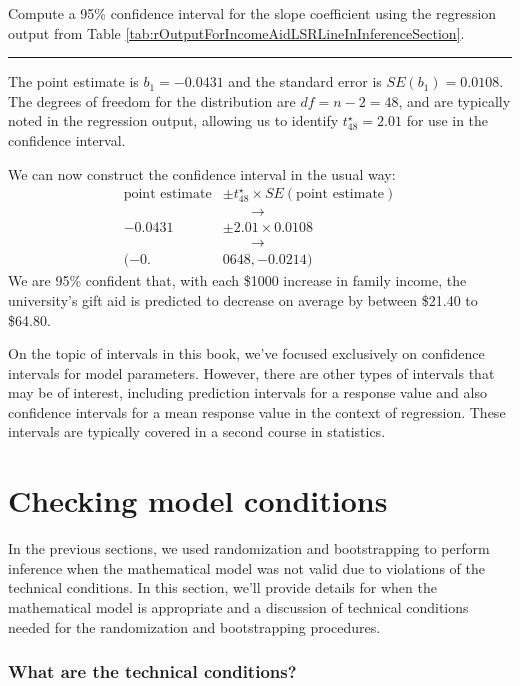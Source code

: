 \documentclass[
  10pt,
  openany]{book}
\theoremstyle{definition}
\theoremstyle{definition}
\theoremstyle{definition}
\theoremstyle{definition}
\theoremstyle{remark}
\begin{document}
Compute a 95\% confidence interval for the slope coefficient using the
regression output from Table \ref{tab:rOutputForIncomeAidLSRLineInInferenceSection}.

\begin{center}\rule{0.5\linewidth}{0.5pt}\end{center}

The point estimate is \(b_1 = -0.0431\) and the standard error is \(SE(b_1) = 0.0108\). The degrees of freedom for the distribution are \(df = n - 2 = 48\), and are typically noted in the regression output, allowing us to identify \(t_{48}^{\star} = 2.01\) for use in the confidence interval.

We can now construct the confidence interval in the usual way:
\[\begin{aligned}
  \text{point estimate} &\pm t_{48}^{\star} \times SE(\text{point estimate}) \\
  &\qquad\to\qquad \\
    -0.0431  &\pm 2.01 \times 0.0108 \\
    &\qquad\to\qquad\\
    (-0.&0648, -0.0214)
  \end{aligned}\]
We are 95\% confident that, with each \$1000 increase in
family income, the university's gift aid is predicted to decrease on average by between \$21.40 to \$64.80.

On the topic of intervals in this book, we've focused exclusively on
confidence intervals for model parameters. However, there are other
types of intervals that may be of interest, including prediction
intervals for a response value and also confidence intervals for a mean
response value in the context of regression. These intervals are typically covered in a second course in statistics.

\section{Checking model conditions}\label{tech-cond-linmod}

In the previous sections, we used randomization and bootstrapping to perform inference when the mathematical model was not valid due to violations of the technical conditions. In this section, we'll provide details for when the mathematical model is appropriate and a discussion of technical conditions needed for the randomization and bootstrapping procedures.

\subsubsection*{What are the technical conditions?}\label{what-are-the-technical-conditions}
\end{document}
